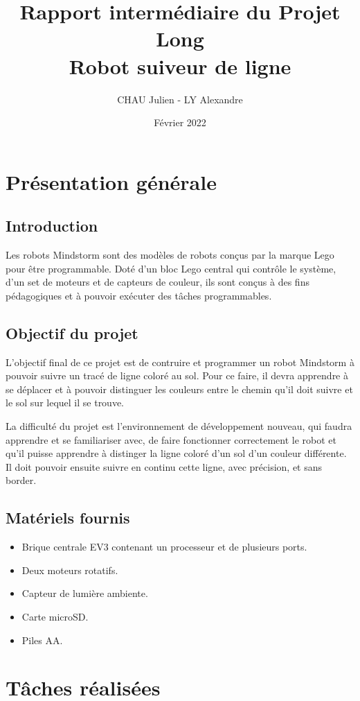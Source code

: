 \documentclass{article}
\title{Rapport intermédiaire du Projet Long \\ Robot suiveur de ligne}
\author{CHAU Julien - LY Alexandre}
\date{Février 2022}
\begin{document}
\maketitle

\section{Présentation générale}
\subsection{Introduction}
Les robots Mindstorm sont des modèles de robots conçus par la marque Lego pour être programmable. Doté d'un bloc Lego central qui contrôle le système, d'un set de moteurs et de capteurs de couleur, ils sont conçus à des fins pédagogiques et à pouvoir exécuter des tâches programmables. 

\subsection{Objectif du projet}
L'objectif final de ce projet est de contruire et programmer un robot Mindstorm à pouvoir suivre un tracé de ligne coloré au sol. Pour ce faire, il devra apprendre à se déplacer et à pouvoir distinguer les couleurs entre le chemin qu'il doit suivre et le sol sur lequel il se trouve. 

La difficulté du projet est l'environnement de développement nouveau, qui faudra apprendre et se familiariser avec, de faire fonctionner correctement le robot et qu'il puisse apprendre à distinger la ligne coloré d'un sol d'un couleur différente. Il doit pouvoir ensuite suivre en continu cette ligne, avec précision, et sans border.

\subsection{Matériels fournis}
\begin{itemize}
    \item Brique centrale EV3 contenant un processeur et de plusieurs ports.
    \item Deux moteurs rotatifs.
    \item Capteur de lumière ambiente.
    \item Carte microSD.
    \item Piles AA.
\end{itemize}

\section{Tâches réalisées}
\end{document}
